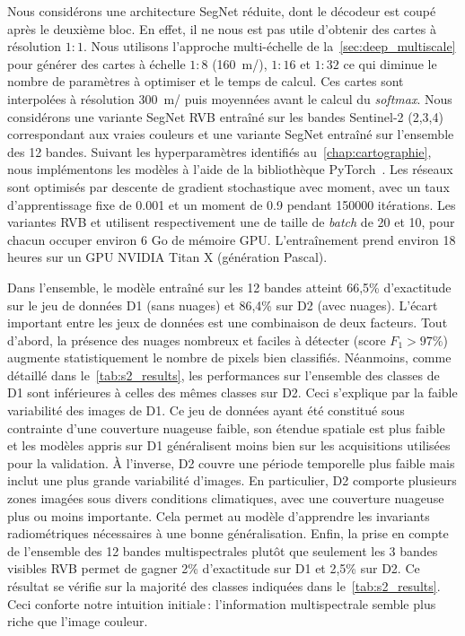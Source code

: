 Nous considérons une architecture SegNet réduite, dont le décodeur est coupé après le deuxième bloc. En effet, il ne nous est pas utile d'obtenir des cartes à résolution $1:1$. Nous utilisons l'approche multi-échelle de la~\cref{sec:deep_multiscale} pour générer des cartes à échelle $1:8$ (\SI{160}{\meter/\px}), $1:16$ et $1:32$ ce qui diminue le nombre de paramètres à optimiser et le temps de calcul. Ces cartes sont interpolées à résolution \SI{300}{\meter/\px} puis moyennées avant le calcul du \emph{softmax}. Nous considérons une variante SegNet \gls{RVB} entraîné sur les bandes Sentinel-2 (2,3,4) correspondant aux vraies couleurs et une variante SegNet  entraîné sur l'ensemble des 12 bandes. Suivant les hyperparamètres identifiés au~\cref{chap:cartographie}, nous implémentons les modèles à l'aide de la bibliothèque \gls{PyTorch}~\cite{noauthor_pytorch_2016}. Les réseaux sont optimisés par descente de gradient stochastique avec moment, avec un taux d'apprentissage fixe de \num{0,001} et un moment de \num{0,9} pendant \num{150000} itérations. Les variantes \gls{RVB} et  utilisent respectivement une de taille de \emph{batch} de 20 et 10, pour chacun occuper environ 6 Go de mémoire \gls{GPU}. L'entraînement prend environ 18 heures sur un \gls{GPU} NVIDIA Titan X (génération Pascal).

Dans l'ensemble, le modèle entraîné sur les 12 bandes atteint 66,5\% d'exactitude sur le jeu de données D1 (sans nuages) et 86,4\% sur D2 (avec nuages). L'écart important entre les jeux de données est une combinaison de deux facteurs. Tout d'abord, la présence des nuages nombreux et faciles à détecter (score $F_1 > 97\%$) augmente statistiquement le nombre de pixels bien classifiés. Néanmoins, comme détaillé dans le~\cref{tab:s2_results}, les performances sur l'ensemble des classes de D1 sont inférieures à celles des mêmes classes sur D2. Ceci s'explique par la faible variabilité des images de D1. Ce jeu de données ayant été constitué sous contrainte d'une couverture nuageuse faible, son étendue spatiale est plus faible et les modèles appris sur D1 généralisent moins bien sur les acquisitions utilisées pour la validation. À l'inverse, D2 couvre une période temporelle plus faible mais inclut une plus grande variabilité d'images. En particulier, D2 comporte plusieurs zones imagées sous divers conditions climatiques, avec une couverture nuageuse plus ou moins importante. Cela permet au modèle d'apprendre les invariants radiométriques nécessaires à une bonne généralisation.
Enfin, la prise en compte de l'ensemble des 12 bandes multispectrales plutôt que seulement les 3 bandes visibles \gls{RVB} permet de gagner 2\% d'exactitude sur D1 et 2,5\% sur D2. Ce résultat se vérifie sur la majorité des classes indiquées dans le~\cref{tab:s2_results}. Ceci conforte notre intuition initiale\,: l'information multispectrale semble plus riche que l'image couleur.

